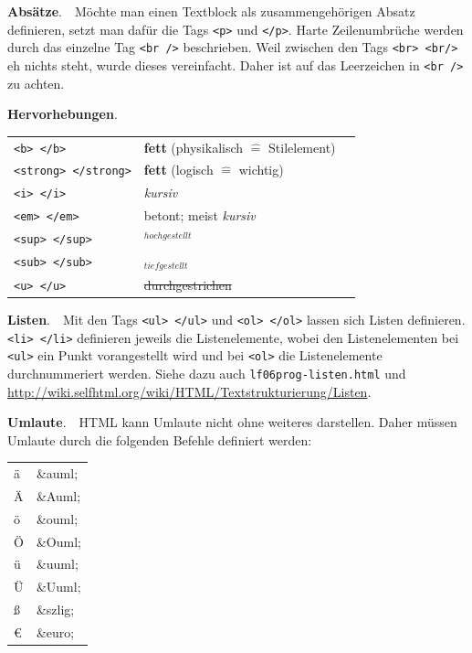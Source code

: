 {\bf Absätze}.\ \ Möchte man einen Textblock als zusammengehörigen Absatz definieren, setzt man dafür die Tags \texttt{<p>} und \texttt{</p>}. Harte Zeilenumbrüche werden durch das einzelne Tag \texttt{<br />} beschrieben. Weil zwischen den Tags \texttt{<br> <br/>} eh nichts steht, wurde dieses vereinfacht. Daher ist auf das Leerzeichen in \texttt{<br />} zu achten.\newline

{\bf Hervorhebungen}.\\
\begin{tabular}{lll}
\texttt{<b> </b>} & {\bf fett} (physikalisch $\widehat{=}$ Stilelement) & \\
\texttt{<strong> </strong>} & {\bf fett} (logisch $\widehat{=}$ wichtig) & \\
\texttt{<i> </i>} & {\it kursiv} & \\
\texttt{<em> </em>} & betont; meist {\it kursiv} & \\
\texttt{<sup> </sup>} & $^{hochgestellt}$ & \\
\texttt{<sub> </sub>} & $_{tiefgestellt}$ & \\
\texttt{<u> </u>} & \sout{durchgestrichen} & \\
\end{tabular}\newline

{\bf Listen}.\ \ Mit den Tags \texttt{<ul> </ul>} und \texttt{<ol> </ol>} lassen sich Listen definieren. \texttt{<li> </li>} definieren jeweils die Listenelemente, wobei den Listenelementen bei \texttt{<ul>} ein Punkt vorangestellt wird und bei \texttt{<ol>} die Listenelemente durchnummeriert werden. Siehe dazu auch \texttt{lf06prog-listen.html} und \url{http://wiki.selfhtml.org/wiki/HTML/Textstrukturierung/Listen}.\newline

{\bf Umlaute}.\ \ HTML kann Umlaute nicht ohne weiteres darstellen. Daher müssen Umlaute durch die folgenden Befehle definiert werden:\\
\begin{tabular}{ll}
ä & \&auml;\\
Ä & \&Auml;\\
ö & \&ouml;\\
Ö & \&Ouml;\\
ü & \&uuml;\\
Ü & \&Uuml;\\
ß & \&szlig;\\
\euro & \&euro;\\
\end{tabular}\newline

